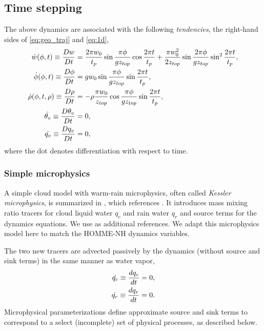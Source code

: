 \subsection{Time stepping}

The above dynamics are associated with the following \emph{tendencies}, the right-hand sides of \eqref{eq:geo_traj} and \eqref{eq:1d},
\begin{subequations}\label{eq:tends}
  \begin{align}
     \dot{w}(\phi,t) \equiv \frac{D w}{Dt}  &= \frac{2\pi w_0}{t_p}\sin\frac{\pi\phi}{gz_{top}}\cos\frac{2\pi t}{t_p} + \frac{\pi w_0^2}{2z_{top}}\sin\frac{2\pi\phi}{gz_{top}}\sin^2\frac{2\pi t}{t_p},\\
    \dot{\phi}(\phi,t) \equiv \frac{D \phi}{Dt} &= gw_0 \sin \frac{\pi \phi}{g z_{top}}\sin\frac{2\pi t}{t_p},\\
    \dot{\rho}(\phi, t, \rho) \equiv \frac{D \rho}{Dt} &= -\rho \frac{\pi w_0}{z_{top}}\cos\frac{\pi \phi}{g z_{top}}\sin\frac{2\pi t}{t_p},\\
    \dot{\theta_v} \equiv \frac{D \theta_v}{Dt} &= 0,\\
    \dot{q_v} \equiv \frac{D q_v}{Dt} &= 0,
  \end{align}
\end{subequations} 
where the dot denotes differentiation with respect to time.

\subsubsection{Simple microphysics}

A simple cloud model with warm-rain microphysics, often called \emph{Kessler microphysics}, is summarized in \cite[ch.~15]{RogersYau}, which references \cite{Srivastava1967}.
It introduces mass mixing ratio tracers for cloud liquid water $q_c$ and rain water $q_r$ and source terms for the dynamics equations.  
We use \cite{SoongOgura1973,KlempWilhelmson1978} as additional references.
We adapt this microphysics model here to match the HOMME-NH dynamics variables.

The two new tracers are advected passively by the dynamics (without source and sink terms) in the same manner as water vapor,
\begin{subequations}
  \begin{align}
    \dot{q_c} \equiv \frac{ d q_c}{d t} &= 0,\\
    \dot{q_r} \equiv \frac{ d q_r}{d t} &= 0.
  \end{align}
\end{subequations}
Microphysical parameterizations define approximate source and sink terms to correspond to a select (incomplete) set of physical processes, as described below.


